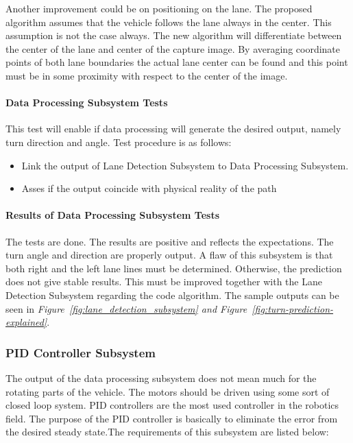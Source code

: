 \documentclass[a4paper,12pt]{article}
\begin{document}
		Another improvement could be on positioning on the lane. The proposed algorithm assumes that the vehicle follows the lane always in the center. This assumption is not the case always. The new algorithm will differentiate between the center of the lane and center of the capture image. By averaging coordinate points of both lane boundaries the actual lane center can be found and this point must be in some proximity with respect to the center of the image.
		
	\paragraph{Data Processing Subsystem Tests}	
		This test will enable if data processing will generate the desired output, namely turn direction and angle. Test procedure is as follows:
		\begin{itemize}
			\item Link the output of Lane Detection Subsystem to Data Processing Subsystem.
			\item Asses if the output coincide with physical reality of the path
		\end{itemize}
	\paragraph{Results of Data Processing Subsystem Tests}
	The tests are done. The results are positive and reflects the expectations. The turn angle and direction are properly output. A flaw of this subsystem is that both right and the left lane lines must be determined. Otherwise, the prediction does not give stable results. This must be improved together with the Lane Detection Subsystem regarding the code algorithm.	The sample outputs can be seen in \textit{Figure~\ref{fig:lane_detection_subsystem} and Figure~\ref{fig:turn-prediction-explained}}.
	
	\subsubsection{PID Controller Subsystem}
	
	The output of the data processing subsystem does not mean much for the rotating parts of the vehicle. The motors should be driven using some sort of closed loop system. PID controllers are the most used controller in the robotics field. The purpose of the PID controller is basically to eliminate the error from the desired steady state.The requirements of this subsystem are listed below:
	
\end{document}
